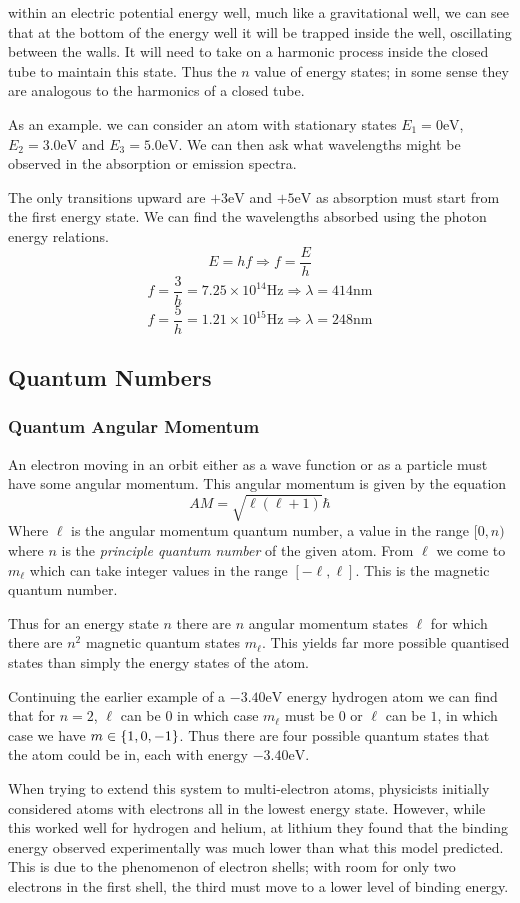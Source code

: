 \documentclass[12pt]{report}
\begin{document}
\begin{flushleft}
within an electric potential energy well, much like a gravitational well,
we can see that at the bottom of the energy well it will be trapped inside
the well, oscillating between the walls. It will need to take on a harmonic
process inside the closed tube to maintain this state. Thus the \(n\) value
of energy states; in some sense they are analogous to the harmonics of a
closed tube. \par
As an example. we can consider an atom with stationary states
\(E_1 = 0\mathrm{eV}\), \(E_2 = 3.0\mathrm{eV}\) and \(E_3 = 5.0\mathrm{eV}\).
We can then ask what wavelengths might be observed in the absorption or
emission spectra. \par
The only transitions upward are \(+3\mathrm{eV}\) and \(+5\mathrm{eV}\) as
absorption must start from the first energy state. We
can find the wavelengths absorbed using the photon energy relations.
\[E = hf \Rightarrow f = \frac{E}{h}\]
\[f = \frac{3}{h} = 7.25\times10^{14}\mathrm{Hz} \Rightarrow \lambda
= 414\mathrm{nm}\]
\[f = \frac{5}{h} = 1.21\times10^{15}\mathrm{Hz} \Rightarrow \lambda
= 248\mathrm{nm}\]

\subsection*{Quantum Numbers}

\subsubsection*{Quantum Angular Momentum}

An electron moving in an orbit either as a wave function or as a particle must
have some angular momentum. This angular momentum is given by the equation
\[AM = \sqrt{\ell(\ell + 1)}\hbar\]
Where \(\ell\) is the angular momentum quantum number, a value in the range
\([0, n)\) where \(n\) is the \textit{principle quantum number} of the given
atom. From \(\ell\) we come to \(m_\ell\) which can take integer values in the
range \([-\ell, \ell]\). This is the magnetic quantum number. \par
Thus for an energy state \(n\) there are \(n\) angular momentum states \(\ell\)
for which there are \(n^2\) magnetic quantum states \(m_\ell\). This yields far
more possible quantised states than simply the energy states of the atom. \par
Continuing the earlier example of a \(-3.40\mathrm{eV}\) energy hydrogen atom
we can find that for \(n = 2\), \(\ell\) can be \(0\) in which case \(m_\ell\)
must be \(0\) or \(\ell\) can be \(1\), in which case we have
\(m \in \set{1, 0, -1}\). Thus there are four possible quantum states that the
atom could be in, each with energy \(-3.40\mathrm{eV}\). \par
When trying to extend this system to multi-electron atoms, physicists initially
considered atoms with electrons all in the lowest energy state. However, while
this worked well for hydrogen and helium, at lithium they found that the
binding energy observed experimentally was much lower than what this model
predicted. This is due to the phenomenon of electron shells; with room for only
two electrons in the first shell, the third must move to a lower level of
binding energy. 


\end{flushleft}
\end{document}
